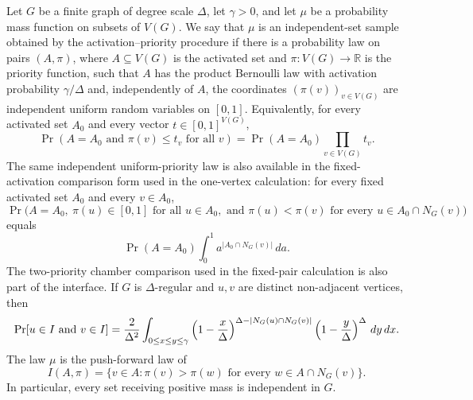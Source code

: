 \begin{definition}
Let $G$ be a finite graph of degree scale $\Delta$, let $\gamma>0$, and let
$\mu$ be a probability mass function on subsets of $V(G)$.  We say that
$\mu$ is an independent-set sample obtained by the activation--priority
procedure if there is a probability law on pairs $(A,\pi)$, where
$A\subseteq V(G)$ is the activated set and $\pi:V(G)\to\mathbb R$ is the
priority function, such that $A$ has the product Bernoulli law with activation
probability $\gamma/\Delta$ and, independently of $A$, the coordinates
$(\pi(v))_{v\in V(G)}$ are independent uniform random variables on $[0,1]$.
Equivalently, for every activated set $A_0$ and every vector
$t\in[0,1]^{V(G)}$,
\[
\Pr(A=A_0\text{ and }\pi(v)\le t_v\text{ for all }v)
=\Pr(A=A_0)\prod_{v\in V(G)} t_v.
\]
The same independent uniform-priority law is also available in the
fixed-activation comparison form used in the one-vertex calculation: for every
fixed activated set $A_0$ and every $v\in A_0$,
\[
\Pr\bigl(A=A_0,\ \pi(u)\in[0,1]\text{ for all }u\in A_0,\text{ and }
\pi(u)<\pi(v)\text{ for every }u\in A_0\cap N_G(v)\bigr)
\]
equals
\[
\Pr(A=A_0)\int_0^1 a^{|A_0\cap N_G(v)|}\,da .
\]
The two-priority chamber comparison used in the fixed-pair calculation is also
part of the interface.  If $G$ is $\Delta$-regular and $u,v$ are distinct
non-adjacent vertices, then
\[
\Pr[u\in I\hbox{ and }v\in I]
=
\frac{2}{\Delta^2}
\int_{0\le x\le y\le\gamma}
\left(1-\frac{x}{\Delta}\right)^{\Delta-|N_G(u)\cap N_G(v)|}
\left(1-\frac{y}{\Delta}\right)^\Delta\,dy\,dx .
\]
The law $\mu$ is the push-forward law of
\[
I(A,\pi)=\{v\in A:\pi(v)>\pi(w)\text{ for every }w\in A\cap N_G(v)\}.
\]
In particular, every set receiving positive mass is independent in $G$.
\end{definition}
